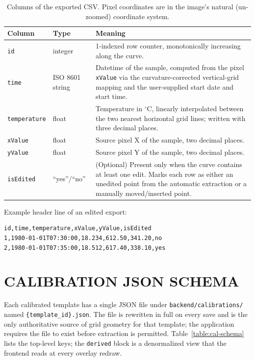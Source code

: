 \documentclass[a4paper,12pt]{report}
\begin{document}
\begin{table}[h!]
\caption[CSV export schema]{Columns of the exported CSV. Pixel coordinates are in the image's natural (un-zoomed) coordinate system.}
\begin{center}
\begin{tabular}{|l|l|p{7cm}|} \hline
\textbf{Column} & \textbf{Type} & \textbf{Meaning} \\\hline
\texttt{id}          & integer       & 1-indexed row counter, monotonically increasing along the curve. \\\hline
\texttt{time}        & ISO 8601 string & Datetime of the sample, computed from the pixel \texttt{xValue} via the curvature-corrected vertical-grid mapping and the user-supplied start date and start time. \\\hline
\texttt{temperature} & float         & Temperature in $^\circ$C, linearly interpolated between the two nearest horizontal grid lines; written with three decimal places. \\\hline
\texttt{xValue}      & float         & Source pixel X of the sample, two decimal places. \\\hline
\texttt{yValue}      & float         & Source pixel Y of the sample, two decimal places. \\\hline
\texttt{isEdited}    & ``yes''/``no'' & (Optional) Present only when the curve contains at least one edit. Marks each row as either an unedited point from the automatic extraction or a manually moved/inserted point. \\\hline
\end{tabular}
\label{table:csv-schema}
\end{center}
\end{table}

Example header line of an edited export:
\begin{verbatim}
id,time,temperature,xValue,yValue,isEdited
1,1980-01-01T07:30:00,18.234,612.50,341.20,no
2,1980-01-01T07:35:00,18.512,617.40,338.10,yes
\end{verbatim}

\chapter{CALIBRATION JSON SCHEMA}

Each calibrated template has a single JSON file under \texttt{backend/calibrations/} named \texttt{\{template\_id\}.json}. The file is rewritten in full on every save and is the only authoritative source of grid geometry for that template; the application requires the file to exist before extraction is permitted. Table~\ref{table:cal-schema} lists the top-level keys; the \texttt{derived} block is a denormalized view that the frontend reads at every overlay redraw.
\end{document}
